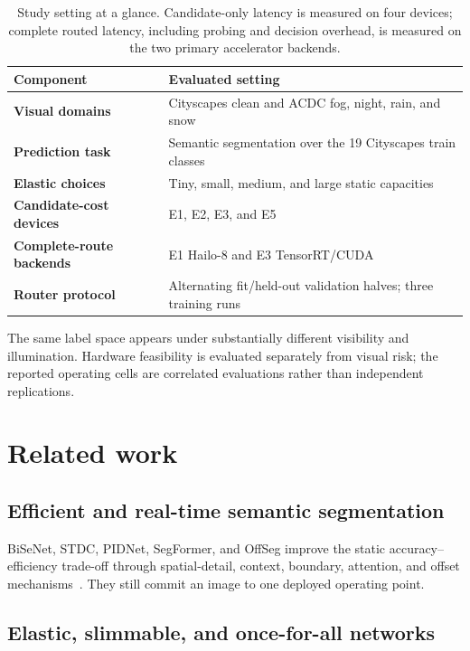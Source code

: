 \documentclass[a4paper,review,12pt]{elsarticle}
\begin{document}
\begin{table}[H]
\centering
\caption{Study setting at a glance. Candidate-only latency is measured on four devices; complete routed latency, including probing and decision overhead, is measured on the two primary accelerator backends.}
\label{tab:study-setting}
\small
\begin{tabularx}{\textwidth}{@{}>{\bfseries}lX@{}}
\toprule
Component & Evaluated setting \\
\midrule
Visual domains & Cityscapes clean and ACDC fog, night, rain, and snow \\
Prediction task & Semantic segmentation over the 19 Cityscapes train classes \\
Elastic choices & Tiny, small, medium, and large static capacities \\
Candidate-cost devices & E1, E2, E3, and E5 \\
Complete-route backends & E1 Hailo-8 and E3 TensorRT/CUDA \\
Router protocol & Alternating fit/held-out validation halves; three training runs \\
\bottomrule
\end{tabularx}
\end{table}

The same label space appears under substantially different visibility and illumination. Hardware feasibility is evaluated separately from visual risk; the reported operating cells are correlated evaluations rather than independent replications.

\section{Related work}
\label{sec:related}

\subsection{Efficient and real-time semantic segmentation}

BiSeNet, STDC, PIDNet, SegFormer, and OffSeg improve the static accuracy--efficiency trade-off through spatial-detail, context, boundary, attention, and offset mechanisms~\cite{yu2018bisenet,fan2021stdc,xu2023pidnet,xie2021segformer,zhang2025offseg}. They still commit an image to one deployed operating point.

\subsection{Elastic, slimmable, and once-for-all networks}
\end{document}

